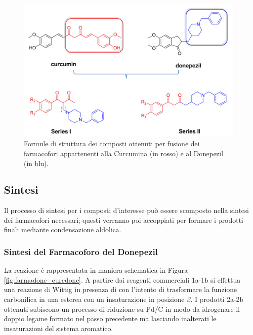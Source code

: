 \documentclass[a4paper, 12pt]{article}
\begin{document}
\begin{figure}[H]
	\centering
	\includegraphics[width=\linewidth]{immagini/generale_curcdone.png}
	\caption{Formule di struttura dei composti ottenuti per fusione dei farmacofori appartenenti alla Curcumina (in rosso) e al Donepezil (in blu).}
	\label{fig:generale_curcdone}
\end{figure}



\subsection{Sintesi}
Il processo di sintesi per i composti d'interesse può essere scomposto nella sintesi dei farmacofori necessari; questi verranno poi accoppiati per formare i prodotti finali mediante condensazione aldolica.

\subsubsection{Sintesi del Farmacoforo del Donepezil}
\label{sec:sintesidone}
La reazione è rappresentata in maniera schematica in Figura \ref{fig:farmadone_curcdone}. A partire dai reagenti commerciali 1a-1b si effettua una reazione di Wittig in presenza di  con l'intento di trasformare la funzione carbonilica in una esterea con un insaturazione in posizione $\beta$. I prodotti 2a-2b ottenuti subiscono un processo di riduzione su Pd/C in modo da idrogenare il doppio legame formato nel passo precedente ma lasciando inalterati le insaturazioni del sistema aromatico.
\end{document}
